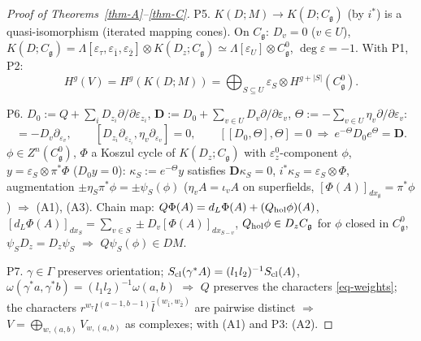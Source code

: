 \documentclass[10pt,a4paper]{article}
\numberwithin{equation}{section}
\theoremstyle{definition}
\theoremstyle{remark}
\newcommand{\g}{\mathfrak g}
\newcommand{\Cg}{C^0_{\g}}
\begin{document}
\begin{proof}[Proof of Theorems~\ref{thm-A}--\ref{thm-C}]
P5. $K(D;M)\to K(D;C_\g)$ (by $i^*$) is a quasi-isomorphism (iterated mapping cones). On $C_\g$: $D_v=0$ ($v\in U$), $K(D;C_\g)=\Lambda[\varepsilon_\tau,\varepsilon_{\bar1},\varepsilon_{\bar2}]\otimes K(D_z;C_\g)\simeq\Lambda[\varepsilon_U]\otimes\Cg$, $\deg\varepsilon=-1$. With P1, P2:
\begin{equation}
H^g(V)=H^g(K(D;M))=\bigoplus_{S\subseteq U}\varepsilon_S\otimes H^{g+|S|}(\Cg).\label{eq-A-sum}
\end{equation}

P6. $D_0:=Q+\sum_iD_{z_i}\partial/\partial\varepsilon_{z_i}$, $\mathbf D:=D_0+\sum_{v\in U}D_v\partial/\partial\varepsilon_v$, $\Theta:=-\sum_{v\in U}\eta_v\partial/\partial\varepsilon_v$:
\begin{equation}
[Q,\eta_v\partial_{\varepsilon_v}]=-D_v\partial_{\varepsilon_v},\qquad [D_{z_i}\partial_{\varepsilon_{z_i}},\eta_v\partial_{\varepsilon_v}]=0,\qquad [[D_0,\Theta],\Theta]=0\ \Longrightarrow\ e^{-\Theta}D_0e^{\Theta}=\mathbf D .
\end{equation}
$\phi\in Z^n(\Cg)$, $\Phi$ a Koszul cycle of $K(D_z;C_\g)$ with $\varepsilon_z^0$-component $\phi$, $y=\varepsilon_S\otimes\pi^*\Phi$ ($D_0y=0$): $\kappa_S:=e^{-\Theta}y$ satisfies $\mathbf D\kappa_S=0$, $i^*\kappa_S=\varepsilon_S\otimes\Phi$, augmentation $\pm\eta_S\pi^*\phi=\pm\psi_S(\phi)$ ($\eta_vA=\iota_vA$ on superfields, $[\Phi(A)]_{dx_\emptyset}=\pi^*\phi$) $\Rightarrow$ (A1), (A3). Chain map: $Q\Phi(A)=d_L\Phi(A)+(Q_{\rm hol}\phi)(A)$, $[d_L\Phi(A)]_{dx_S}=\sum_{v\in S}\pm D_v[\Phi(A)]_{dx_{S-v}}$, $Q_{\rm hol}\phi\in D_zC_\g$ for $\phi$ closed in $\Cg$, $\psi_SD_z=D_z\psi_S$ $\Rightarrow$ $Q\psi_S(\phi)\in DM$.

P7. $\gamma\in\Gamma$ preserves orientation; $S_{\rm cl}(\gamma^*A)=(l_1l_2)^{-1}S_{\rm cl}(A)$, $\omega(\gamma^*a,\gamma^*b)=(l_1l_2)^{-1}\omega(a,b)$ $\Rightarrow$ $Q$ preserves the characters \eqref{eq-weights}; the characters $r^{w_\tau}l^{(a-1,b-1)}\bar l^{(w_{\bar1},w_{\bar2})}$ are pairwise distinct $\Rightarrow$ $V=\bigoplus_{w,(a,b)}V_{w,(a,b)}$ as complexes; with (A1) and P3: (A2).


\end{proof}
\end{document}
